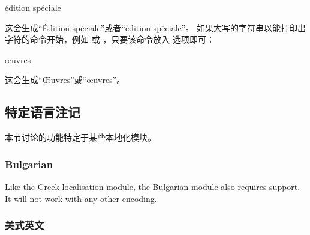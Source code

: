 \begin{ltxsyntax}
\begin{ltxexample}
\autocap{\'e}dition sp\'eciale
\end{ltxexample}
%
这会生成“Édition spéciale”或者“édition spéciale”。
如果大写的字符串以能打印出字符的命令开始，例如  或 ，只要该命令放入  选项即可：

\begin{ltxexample}
\autocap{\oe}uvres
\end{ltxexample}
%
这会生成“Œuvres”或“œuvres”。

\end{ltxsyntax}

\subsection[语言注记]{特定语言注记}%
\label{use:loc}

本节讨论的功能特定于某些本地化模块。
\subsubsection{Bulgarian}
\label{use:loc:bul}

Like the Greek localisation module, the Bulgarian module also requires \utf support. It will not work with any other encoding.

\subsubsection{美式英文}%
\label{use:loc:us}


